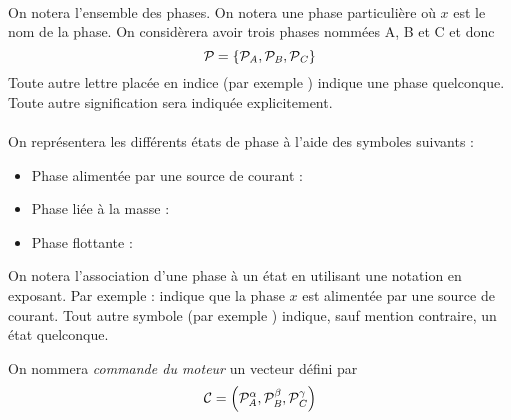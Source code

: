 \paragraph{}
On notera \phase{} l'ensemble des phases. On notera  une phase particulière où $x$ est le nom de la phase. On considèrera avoir trois phases nommées A, B et C et donc
$$\mathcal{P}_\mathit{} = \{\mathcal{P}_\mathit{A} , \mathcal{P}_\mathit{B}, \mathcal{P}_\mathit{C}\} $$
Toute autre lettre placée en indice (par exemple ) indique une phase quelconque. Toute autre signification sera indiquée explicitement.

\paragraph{}
On représentera les différents états de phase à l'aide des symboles suivants :
\begin{itemize}
    \item Phase alimentée par une source de courant : \phhi
    \item Phase liée à la masse : \phlo
    \item Phase flottante : \phoff
\end{itemize}
On notera l'association d'une phase à un état en utilisant une notation en exposant.
Par exemple :  indique que la phase $x$ est alimentée par une source de courant.
Tout autre symbole (par exemple ) indique, sauf mention contraire, un état quelconque.

On nommera \emph{commande du moteur} un vecteur \cmdmot défini par
$$ \mathcal{C} = \left(\mathcal{P}_\mathit{A}^{\alpha},\mathcal{P}_\mathit{B}^{\beta},\mathcal{P}_\mathit{C}^{\gamma}\right)$$


